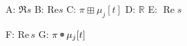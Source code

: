 \documentclass[11pt,twoside,openany]{book}
\begin{document}
\noindent
A: $\Re s$ \quad
B: $\mathrm{Re}s$ \quad
C: $\pi \boxplus \mu_j[t]$ \quad
D: $\mathbb{R}$ \quad
E: $\operatorname{Re}s$
\par\bigskip
\noindent
F: $\mathrm{Re}\,s$ \quad
G: $\pi \tboxplus \mu_j[t]$
\end{document}
